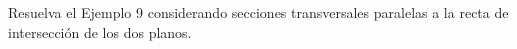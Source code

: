 \item Resuelva el Ejemplo 9 considerando secciones transversales paralelas a la recta de intersección de los dos planos.
